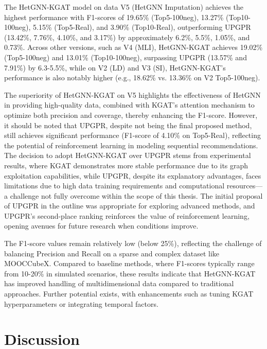 \documentclass{ieeeaccess}
\begin{document}
The HetGNN-KGAT model on data V5 (HetGNN Imputation) achieves the highest performance with F1-scores of 19.65\% (Top5-100neg), 13.27\% (Top10-100neg), 5.15\% (Top5-Real), and 3.90\% (Top10-Real), outperforming UPGPR (13.42\%, 7.76\%, 4.10\%, and 3.17\%) by approximately 6.2\%, 5.5\%, 1.05\%, and 0.73\%. Across other versions, such as V4 (MLI), HetGNN-KGAT achieves 19.02\% (Top5-100neg) and 13.01\% (Top10-100neg), surpassing UPGPR (13.57\% and 7.91\%) by 6.3-5.5\%, while on V2 (LD) and V3 (SI), HetGNN-KGAT's performance is also notably higher (e.g., 18.62\% vs. 13.36\% on V2 Top5-100neg).

The superiority of HetGNN-KGAT on V5 highlights the effectiveness of HetGNN in providing high-quality data, combined with KGAT's attention mechanism to optimize both precision and coverage, thereby enhancing the F1-score. However, it should be noted that UPGPR, despite not being the final proposed method, still achieves significant performance (F1-score of 4.10\% on Top5-Real), reflecting the potential of reinforcement learning in modeling sequential recommendations. The decision to adopt HetGNN-KGAT over UPGPR stems from experimental results, where KGAT demonstrates more stable performance due to its graph exploitation capabilities, while UPGPR, despite its explanatory advantages, faces limitations due to high data training requirements and computational resources—a challenge not fully overcome within the scope of this thesis. The initial proposal of UPGPR in the outline was appropriate for exploring advanced methods, and UPGPR's second-place ranking reinforces the value of reinforcement learning, opening avenues for future research when conditions improve.

The F1-score values remain relatively low (below 25\%), reflecting the challenge of balancing Precision and Recall on a sparse and complex dataset like MOOCCubeX. Compared to baseline methods, where F1-scores typically range from 10-20\% in simulated scenarios, these results indicate that HetGNN-KGAT has improved handling of multidimensional data compared to traditional approaches. Further potential exists, with enhancements such as tuning KGAT hyperparameters or integrating temporal factors.


\section{Discussion}
\label{sec:discussion}
\end{document}

